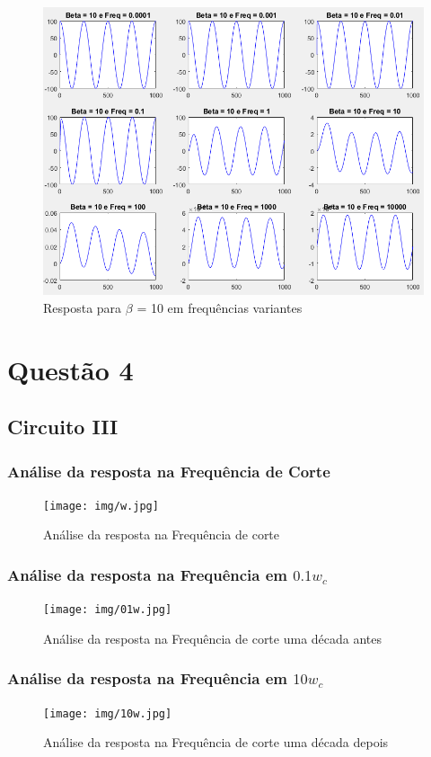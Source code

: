 \documentclass[a4paper, 12pt]{article}
\begin{document}
			\begin{figure}[!ht]
				\centering
				\includegraphics[scale=0.57]{img/3k_beta5.png}
				\caption{Resposta para $\beta$ = 10 em frequências variantes}
			\end{figure}
	\clearpage		
	\newpage
	\section{Questão 4}\label{q4}
		\subsection{Circuito III}
			\subsubsection{Análise da resposta na Frequência de Corte}
			\begin{figure}[!ht]
				\centering
				\texttt{[image: img/w.jpg]}
				\caption{Análise da resposta na Frequência de corte}
			\end{figure}		
			\subsubsection{Análise da resposta na Frequência em $0.1w_{c}$}
			\begin{figure}[!ht]
				\centering
				\texttt{[image: img/01w.jpg]}
				\caption{Análise da resposta na Frequência de corte uma década antes}
			\end{figure}		
			\subsubsection{Análise da resposta na Frequência em $10w_{c}$}
			\begin{figure}[!ht]
				\centering
				\texttt{[image: img/10w.jpg]}
				\caption{Análise da resposta na Frequência de corte uma década depois}
			\end{figure}
\end{document}
